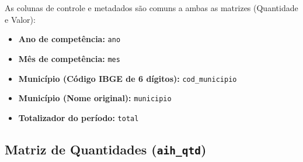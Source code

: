 \documentclass[12pt,a4paper]{report}
\begin{document}
As colunas de controle e metadados são comuns a ambas as matrizes (Quantidade e Valor):
\begin{itemize}
\item \textbf{Ano de competência:} \texttt{ano}
\item \textbf{Mês de competência:} \texttt{mes}
\item \textbf{Município (Código IBGE de 6 dígitos):} \texttt{cod\_municipio}
\item \textbf{Município (Nome original):} \texttt{municipio}
\item \textbf{Totalizador do período:} \texttt{total}
\end{itemize}

\subsection{Matriz de Quantidades (\texttt{aih\_qtd})}
\end{document}
